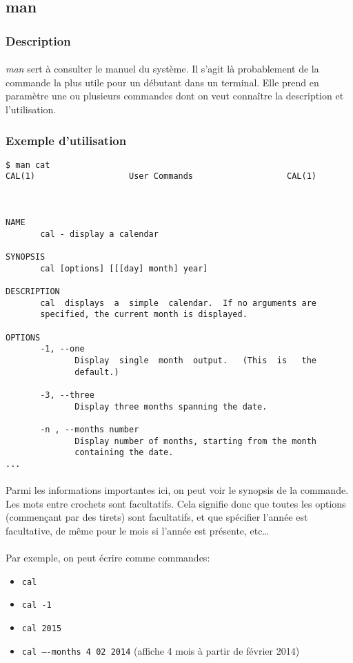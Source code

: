 \subsection{man}

\subsubsection*{Description}

\paragraph{} \emph{man} sert à consulter le manuel du système. Il s'agit là
probablement de la commande la plus utile pour un débutant dans un terminal.
Elle prend en paramètre une ou plusieurs commandes dont on veut connaître la
description et l'utilisation.

\subsubsection*{Exemple d'utilisation}

\begin{lstlisting}
$ man cat
CAL(1)                   User Commands                   CAL(1)



NAME
       cal - display a calendar

SYNOPSIS
       cal [options] [[[day] month] year]

DESCRIPTION
       cal  displays  a  simple  calendar.  If no arguments are
       specified, the current month is displayed.

OPTIONS
       -1, --one
              Display  single  month  output.   (This  is   the
              default.)

       -3, --three
              Display three months spanning the date.

       -n , --months number
              Display number of months, starting from the month
              containing the date.
...
\end{lstlisting}

\paragraph{} Parmi les informations importantes ici, on peut voir le synopsis
de la commande. Les mots entre crochets sont facultatifs. Cela signifie donc
que toutes les options (commençant par des tirets) sont facultatifs, et que
spécifier l'année est facultative, de même pour le mois si l'année est
présente, etc\ldots

\paragraph{} Par exemple, on peut écrire comme commandes:
\begin{itemize}
	\item \texttt{cal}
	\item \texttt{cal -1}
	\item \texttt{cal 2015}
	\item \texttt{cal ----months 4 02 2014} (affiche 4 mois à partir de février
		2014)
\end{itemize}
